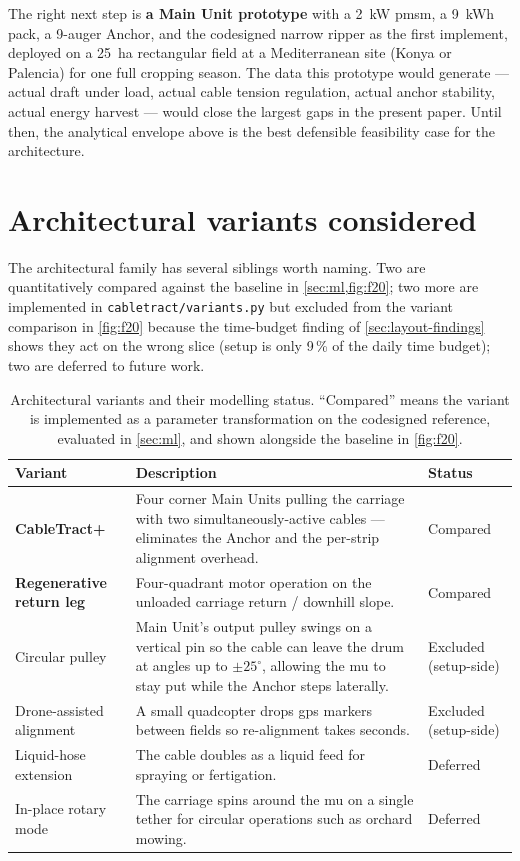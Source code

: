 \documentclass[11pt,a4paper]{article}
\begin{document}
The right next step is \textbf{a Main Unit prototype} with a \SI{2}{\kilo\watt} \gls{pmsm}, a \SI{9}{\kWh} pack, a 9-auger Anchor, and the codesigned narrow ripper as the first implement, deployed on a \SI{25}{\hectare} rectangular field at a Mediterranean site (Konya or Palencia) for one full cropping season. The data this prototype would generate --- actual draft under load, actual cable tension regulation, actual anchor stability, actual energy harvest --- would close the largest gaps in the present paper. Until then, the analytical envelope above is the best defensible feasibility case for the architecture.

\section{Architectural variants considered}\label{sec:variants-named}

The architectural family has several siblings worth naming. Two are quantitatively compared against the baseline in \cref{sec:ml,fig:f20}; two more are implemented in \texttt{cabletract/variants.py} but excluded from the variant comparison in \cref{fig:f20} because the time-budget finding of \cref{sec:layout-findings} shows they act on the wrong slice (setup is only 9\,\% of the daily time budget); two are deferred to future work.

\begin{table}[H]
\centering\small
\caption{Architectural variants and their modelling status. ``Compared'' means the variant is implemented as a parameter transformation on the codesigned reference, evaluated in \cref{sec:ml}, and shown alongside the baseline in \cref{fig:f20}.}\label{tab:variants}
\begin{tabularx}{\textwidth}{lXl}
\toprule
Variant & Description & Status \\
\midrule
\textbf{CableTract+} & Four corner Main Units pulling the carriage with two simultaneously-active cables --- eliminates the Anchor and the per-strip alignment overhead. & Compared \\
\textbf{Regenerative return leg} & Four-quadrant motor operation on the unloaded carriage return / downhill slope. & Compared \\
Circular pulley & Main Unit's output pulley swings on a vertical pin so the cable can leave the drum at angles up to $\pm 25^{\circ}$, allowing the \gls{mu} to stay put while the Anchor steps laterally. & Excluded (setup-side) \\
Drone-assisted alignment & A small quadcopter drops \gls{gps} markers between fields so re-alignment takes seconds. & Excluded (setup-side) \\
Liquid-hose extension & The cable doubles as a liquid feed for spraying or fertigation. & Deferred \\
In-place rotary mode & The carriage spins around the \gls{mu} on a single tether for circular operations such as orchard mowing. & Deferred \\
\bottomrule
\end{tabularx}
\end{table}
\end{document}
